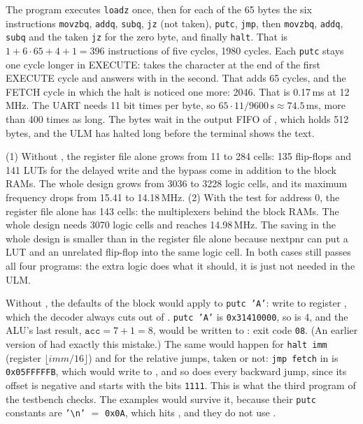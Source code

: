 \solution
The program executes \texttt{loadz} once, then for each of the 65 bytes the
six instructions \texttt{movzbq}, \texttt{addq}, \texttt{subq}, \texttt{jz}
(not taken), \texttt{putc}, \texttt{jmp}, then \texttt{movzbq}, \texttt{addq},
\texttt{subq} and the taken \texttt{jz} for the zero byte, and finally
\texttt{halt}. That is $1 + 6\cdot 65 + 4 + 1 = 396$ instructions of five
cycles, 1980 cycles. Each \texttt{putc} stays one cycle longer in EXECUTE:
 takes the character at the end of the first EXECUTE cycle and
answers with  in the second. That adds 65 cycles, and the
FETCH cycle in which the halt is noticed one more: 2046. That is 0.17\,ms at
12\,MHz. The UART needs 11 bit times per byte, so $65 \cdot 11 /
9600\,\mathrm{s} \approx 74.5$\,ms, more than 400 times as long. The bytes
wait in the output FIFO of , which holds 512 bytes, and the ULM has
halted long before the terminal shows the text.

\solution
(1) Without , the register file alone grows from 11 to
284 cells: 135 flip-flops and 141 LUTs for the delayed write and the bypass
come in addition to the block RAMs. The whole design grows from 3036 to 3228
logic cells, and its maximum frequency drops from 15.41 to 14.18\,MHz. (2)
With the test for address 0, the register file alone has 143 cells: the
multiplexers behind the block RAMs. The whole design needs 3070 logic cells
and reaches 14.98\,MHz. The saving in the whole design is smaller than in the
register file alone because nextpnr can put a LUT and an unrelated flip-flop
into the same logic cell. In both cases  still passes all four
programs: the extra logic does what it should, it is just not needed in the
ULM.

\solution
Without , the defaults of the  block would
apply to \texttt{putc 'A'}: write  to register
, which the decoder always cuts out of .
\texttt{putc 'A'} is \texttt{0x31410000}, so  is 4, and the ALU's
last result, $\mathtt{acc} = 7 + 1 = 8$, would be written to : exit
code \texttt{08}. (An earlier version of  had exactly this
mistake.) The same would happen for \texttt{halt imm} (register
$\lfloor\mathit{imm}/16\rfloor$) and for the relative jumps, taken or not: \texttt{jmp fetch} in  is
\texttt{0x05FFFFFB}, which would write  to , and so does every
backward jump, since its offset is negative and starts with the bits
\texttt{1111}. This is what the third program of the testbench checks. The
examples would survive it, because their \texttt{putc} constants are
\texttt{'\textbackslash n'} $=$ \texttt{0x0A}, which hits , and they do
not use .
